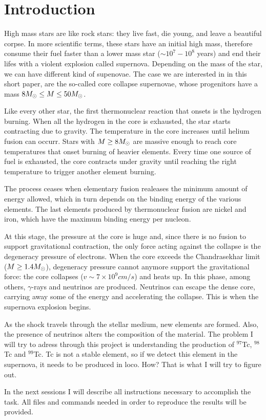 \section*{Introduction}

\hspace{12ex}High mass stars are like rock stars: they live fast, die young, and leave a beautiful corpse. In more scientific terms, these stars have an initial high mass, therefore consume their fuel faster than a lower mass star ($\sim 10^7-10^8$ years) and end their lifes with a violent explosion called supernova. Depending on the mass of the star, we can have different kind of supenovae. The case we are interested in in this short paper, are the so-called core collapse supernovae, whose progenitors have a mass $8 M_{\odot} \leq M \leq 50 M_{\odot}$.

\hspace{12ex}Like every other star, the first thermonuclear reaction that onsets is the hydrogen burning. When all the hydrogen in the core is exhausted, the star starts contracting due to gravity. The temperature in the core increases until helium fusion can occurr. Stars with $M\geq8M_{\odot}$ are massive enough to reach core temperatures that onset burning of heavier elements. Every time one source of fuel is exhausted, the core contracts under gravity until reaching the right temperature to trigger another element burning.

\hspace{12ex}The process ceases when elementary fusion realeases the minimum amount of energy allowed, which in turn depends on the binding energy of the various elements. The last elements produced by thermonuclear fusion are nickel and iron, which have the maximum binding energy per nucleon. 

\hspace{12ex}At this stage, the pressure at the core is huge and, since there is no fusion to support gravitational contraction, the only force acting against the collapse is the degeneracy pressure of electrons. When the core exceeds the Chandrasekhar limit ($M \geq 1.4 M_{\odot}$), degeneracy pressure cannot anymore support the gravitational force: the core collapses ($v\sim 7\times 10^9 cm/s$) and heats up. In this phase, among others, $\gamma$-rays and neutrinos are produced. Neutrinos can escape the dense core, carrying away some of the energy and accelerating the collapse. This is when the supernova explosion begins.   

\hspace{12ex}As the shock travels through the stellar medium, new elements are formed. Also, the presence of neutrinos alters the composition of the material.
The problem I will try to adress through this project is understanding the production of $^{97}$Tc, $^{98}$Tc and $^{99}$Tc. Tc is not a stable element, so if we detect this element in the supernova, it needs to be produced in loco. How? That is what I will try to figure out. 

\hspace{12ex}In the next sessions I will describe all instructions necessary to accomplish the task. All files and commands needed in order to reproduce the results will be provided. 



